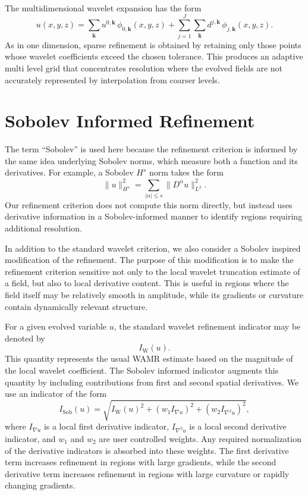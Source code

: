 The multidimensional wavelet expansion has the form
\begin{equation}
    u(x,y,z)
    =
    \sum_{\mathbf{k}}
    u^{0,\mathbf{k}}\,
    \phi_{0,\mathbf{k}}(x,y,z)
    +
    \sum_{j=1}^{J}
    \sum_{\mathbf{k}}
    d^{j,\mathbf{k}}\,
    \phi_{j,\mathbf{k}}(x,y,z).
\end{equation}
As in one dimension, sparse refinement is obtained by retaining only those points whose wavelet coefficients exceed the chosen tolerance. This produces an adaptive multi level grid that concentrates resolution where the evolved fields are not accurately represented by interpolation from coarser levels.

\section{Sobolev Informed Refinement}
\label{sec:sobolev_amr}

The term ``Sobolev'' is used here because the refinement criterion is informed
by the same idea underlying Sobolev norms, which measure both a function and
its derivatives. For example, a Sobolev $H^s$ norm takes the form
\begin{equation}
\|u\|_{H^s}^2
=
\sum_{|\alpha|\leq s}
\|D^\alpha u\|_{L^2}^2.
\end{equation}
Our refinement criterion does not compute this norm directly, but instead uses
derivative information in a Sobolev-informed manner to identify regions
requiring additional resolution.

In addition to the standard wavelet criterion, we also consider a Sobolev inspired modification of the refinement. The purpose of this modification is to make the refinement criterion sensitive not only to the local wavelet truncation estimate of a field, but also to local derivative content. This is useful in regions where the field itself may be relatively smooth in amplitude, while its gradients or curvature contain dynamically relevant structure.

For a given evolved variable $u$, the standard wavelet refinement indicator may be denoted by
\begin{equation}
    I_{\mathrm{W}}(u).
\end{equation}
This quantity represents the usual WAMR estimate based on the magnitude of the local wavelet coefficient. The Sobolev informed indicator augments this quantity by including contributions from first and second spatial derivatives. We use an indicator of the form
\begin{equation}
    I_{\mathrm{Sob}}(u)
    =
    \sqrt{
        I_{\mathrm{W}}(u)^2
        +
        (w_1 I_{\nabla u})^2
        +
        (w_2 I_{\nabla^2 u})^2
    },
    \label{eq:sobolev_amr_indicator}
\end{equation}
where $I_{\nabla u}$ is a local first derivative indicator, $I_{\nabla^2 u}$ is a local second derivative indicator, and $w_1$ and $w_2$ are user controlled weights. Any required normalization of the derivative indicators is absorbed into these weights. The first derivative term increases refinement in regions with large gradients, while the second derivative term increases refinement in regions with large curvature or rapidly changing gradients.

